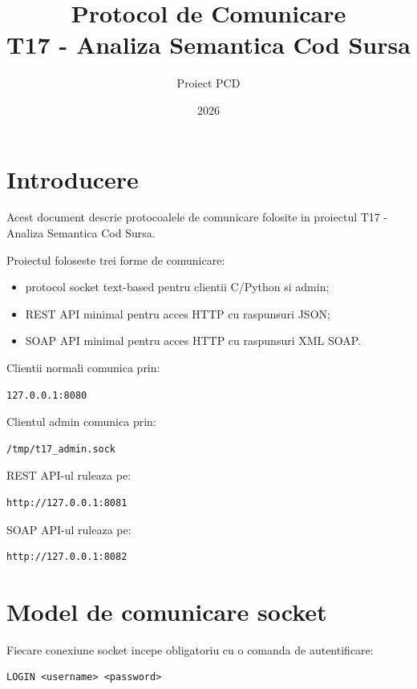 \documentclass[12pt,a4paper]{article}
\title{Protocol de Comunicare \\ T17 - Analiza Semantica Cod Sursa}
\author{Proiect PCD}
\date{2026}
\begin{document}
\maketitle
\tableofcontents
\newpage

\section{Introducere}

Acest document descrie protocoalele de comunicare folosite in proiectul T17 - Analiza Semantica Cod Sursa.

Proiectul foloseste trei forme de comunicare:

\begin{itemize}
    \item protocol socket text-based pentru clientii C/Python si admin;
    \item REST API minimal pentru acces HTTP cu raspunsuri JSON;
    \item SOAP API minimal pentru acces HTTP cu raspunsuri XML SOAP.
\end{itemize}

Clientii normali comunica prin:

\begin{lstlisting}[style=code]
127.0.0.1:8080
\end{lstlisting}

Clientul admin comunica prin:

\begin{lstlisting}[style=code]
/tmp/t17_admin.sock
\end{lstlisting}

REST API-ul ruleaza pe:

\begin{lstlisting}[style=code]
http://127.0.0.1:8081
\end{lstlisting}

SOAP API-ul ruleaza pe:

\begin{lstlisting}[style=code]
http://127.0.0.1:8082
\end{lstlisting}

\section{Model de comunicare socket}

Fiecare conexiune socket incepe obligatoriu cu o comanda de autentificare:

\begin{lstlisting}[style=code]
LOGIN <username> <password>
\end{lstlisting}
\end{document}
